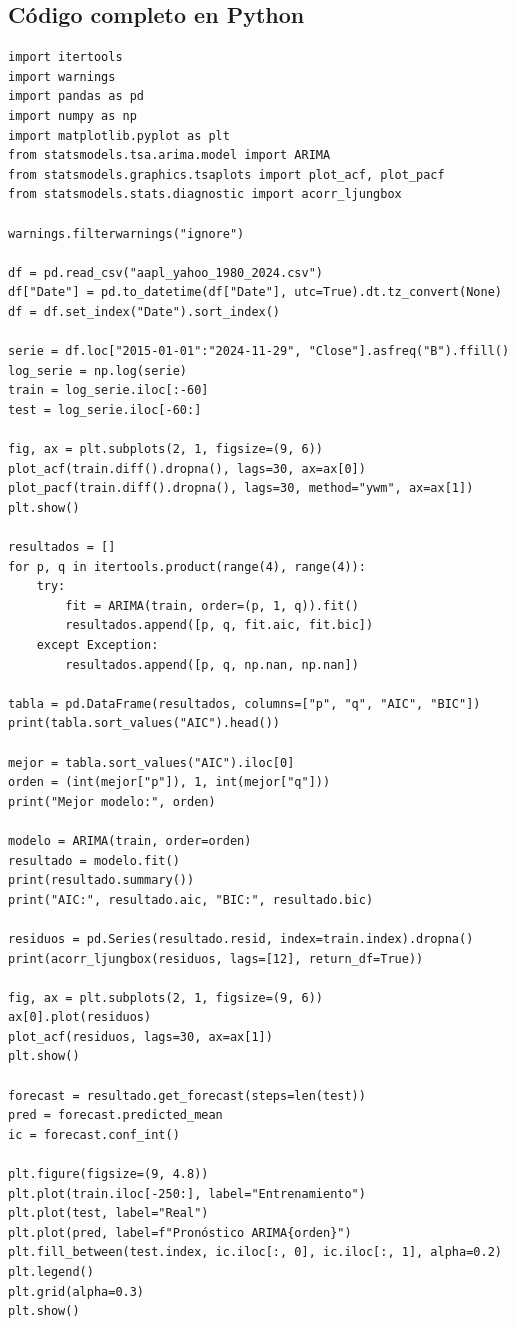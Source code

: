 \documentclass[12pt,a4paper]{article}
\begin{document}
\subsection{Código completo en Python}
\begin{lstlisting}[style=pythonstyle,caption={Ejemplo 2: comparación de modelos con AIC y BIC}]
import itertools
import warnings
import pandas as pd
import numpy as np
import matplotlib.pyplot as plt
from statsmodels.tsa.arima.model import ARIMA
from statsmodels.graphics.tsaplots import plot_acf, plot_pacf
from statsmodels.stats.diagnostic import acorr_ljungbox

warnings.filterwarnings("ignore")

df = pd.read_csv("aapl_yahoo_1980_2024.csv")
df["Date"] = pd.to_datetime(df["Date"], utc=True).dt.tz_convert(None)
df = df.set_index("Date").sort_index()

serie = df.loc["2015-01-01":"2024-11-29", "Close"].asfreq("B").ffill()
log_serie = np.log(serie)
train = log_serie.iloc[:-60]
test = log_serie.iloc[-60:]

fig, ax = plt.subplots(2, 1, figsize=(9, 6))
plot_acf(train.diff().dropna(), lags=30, ax=ax[0])
plot_pacf(train.diff().dropna(), lags=30, method="ywm", ax=ax[1])
plt.show()

resultados = []
for p, q in itertools.product(range(4), range(4)):
    try:
        fit = ARIMA(train, order=(p, 1, q)).fit()
        resultados.append([p, q, fit.aic, fit.bic])
    except Exception:
        resultados.append([p, q, np.nan, np.nan])

tabla = pd.DataFrame(resultados, columns=["p", "q", "AIC", "BIC"])
print(tabla.sort_values("AIC").head())

mejor = tabla.sort_values("AIC").iloc[0]
orden = (int(mejor["p"]), 1, int(mejor["q"]))
print("Mejor modelo:", orden)

modelo = ARIMA(train, order=orden)
resultado = modelo.fit()
print(resultado.summary())
print("AIC:", resultado.aic, "BIC:", resultado.bic)

residuos = pd.Series(resultado.resid, index=train.index).dropna()
print(acorr_ljungbox(residuos, lags=[12], return_df=True))

fig, ax = plt.subplots(2, 1, figsize=(9, 6))
ax[0].plot(residuos)
plot_acf(residuos, lags=30, ax=ax[1])
plt.show()

forecast = resultado.get_forecast(steps=len(test))
pred = forecast.predicted_mean
ic = forecast.conf_int()

plt.figure(figsize=(9, 4.8))
plt.plot(train.iloc[-250:], label="Entrenamiento")
plt.plot(test, label="Real")
plt.plot(pred, label=f"Pronóstico ARIMA{orden}")
plt.fill_between(test.index, ic.iloc[:, 0], ic.iloc[:, 1], alpha=0.2)
plt.legend()
plt.grid(alpha=0.3)
plt.show()
\end{lstlisting}
\end{document}

